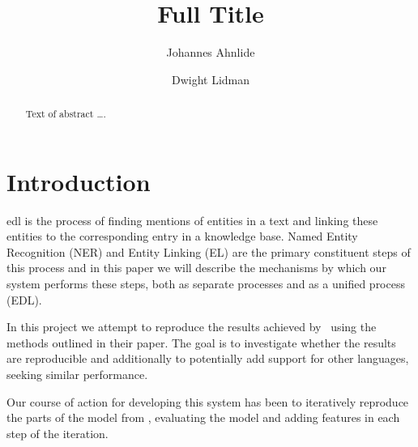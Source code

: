 \documentclass[sigplan,10pt]{acmart}
\begin{document}

\title[Short Title]{Full Title}         %



\author{Johannes Ahnlide}

\author{Dwight Lidman}


\begin{abstract}
Text of abstract \ldots.
\end{abstract}


\maketitle


\section{Introduction}

\acrfull{edl} is the process of finding mentions of entities in a text and linking these entities to the corresponding entry in a knowledge base. Named Entity Recognition (NER) and Entity Linking (EL) are the primary constituent steps of this process and in this paper we will describe the mechanisms by which our system performs these steps, both as separate processes and as a unified process (EDL).

In this project we attempt to reproduce the results achieved by~\cite{YangThe2017} using the methods outlined in their paper. The goal is to investigate whether the results are reproducible and additionally to potentially add support for other languages, seeking similar performance.

Our course of action for developing this system has been to iteratively reproduce the parts of the model from \cite{YangThe2017}, evaluating the model and adding features in each step of the iteration.
\end{document}
